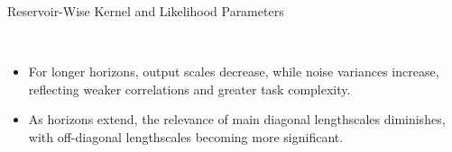 \begin{frame}{Reservoir-Wise Kernel and Likelihood Parameters}
	\vspace{-0.5em}
	\begin{figure}[htbp]
		\captionsetup{skip=-10em} %
		
			\centering
		\tiny
		\setlength{} 
		\setlength{}
		\hspace{2em} %
		\\ %
		\vspace{-1.2em}
		\setlength{} %
		\setlength{}
		\subfloat[$H=1$]{}\hspace{-1.2em}
		\subfloat[$H=14$]{}\hspace{-1.2em}
		\subfloat[$H=30$]{}
	\end{figure}
	\vspace{-1em}
	\begin{itemize}
		\item For longer horizons, output scales decrease, while noise variances increase, reflecting weaker correlations and greater task complexity.
		\item As horizons extend, the relevance of main diagonal lengthscales diminishes, with off-diagonal lengthscales becoming more significant.
	\end{itemize}
	
\end{frame}


